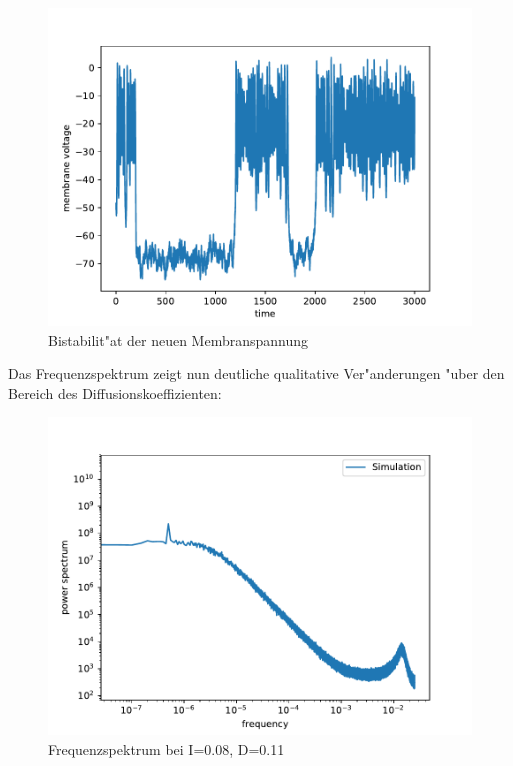 \documentclass[12pt,a4paper]{article}
\begin{document}
\begin{figure}[H]
	\centering
	\includegraphics[scale=0.9]{realstate2.pdf}
	\caption{Bistabilit"at der neuen Membranspannung}
	\label{realburst}
\end{figure}
Das Frequenzspektrum zeigt nun deutliche qualitative Ver"anderungen "uber den Bereich des Diffusionskoeffizienten:
\begin{figure}[H]
	\centering
	\includegraphics[scale=0.9]{inapikrealdrange6a1.pdf}
	\caption{Frequenzspektrum bei I=0.08, D=0.11}
	\label{deltaspectrum}
\end{figure}
\end{document}
